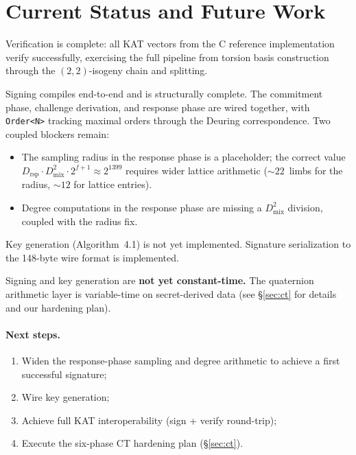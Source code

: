 \section{Current Status and Future Work}
\label{sec:status}

Verification is complete: all KAT vectors from the C reference
implementation verify successfully, exercising the full pipeline from
torsion basis construction through the $(2,2)$-isogeny chain and
splitting.

Signing compiles end-to-end and is structurally complete.  The
commitment phase, challenge derivation, and response phase are wired
together, with \texttt{Order<N>} tracking maximal orders through the
Deuring correspondence.  Two coupled blockers remain:
\begin{itemize}
  \item The sampling radius in the response phase is a placeholder;
    the correct value $D_{\mathrm{rsp}} \cdot D_{\mathrm{mix}}^2
    \cdot 2^{f+1} \approx 2^{1399}$ requires wider lattice
    arithmetic (${\sim}22$~limbs for the radius, ${\sim}12$ for
    lattice entries).
  \item Degree computations in the response phase are missing a
    $D_{\mathrm{mix}}^2$ division, coupled with the radius fix.
\end{itemize}

Key generation (Algorithm~4.1) is not yet implemented.  Signature
serialization to the 148-byte wire format is implemented.

Signing and key generation are \textbf{not yet constant-time.}  The
quaternion arithmetic layer is variable-time on secret-derived data
(see \S\ref{sec:ct} for details and our hardening plan).

\paragraph{Next steps.}
\begin{enumerate}
  \item Widen the response-phase sampling and degree arithmetic to
    achieve a first successful signature;
  \item Wire key generation;
  \item Achieve full KAT interoperability (sign + verify round-trip);
  \item Execute the six-phase CT hardening plan (\S\ref{sec:ct}).
\end{enumerate}
